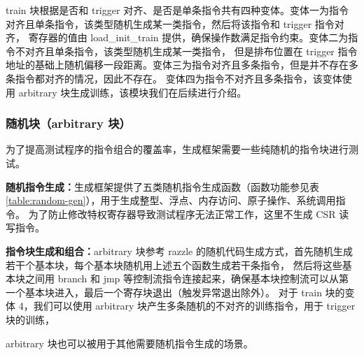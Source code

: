 train 块根据是否和 trigger 对齐、是否是单条指令共有四种变体。变体一为指令对齐且单条指令，该类型随机生成某一类指令，然后将该指令和 trigger 指令对齐，
寄存器的值由 load\_init\_train 提供，确保操作数满足指令约束。变体二为指令不对齐且单条指令，该类型随机生成某一类指令，
但是排布位置在 trigger 指令地址的基础上随机偏移一段距离。变体三为指令对齐且多条指令，但是并不存在多条指令都对齐的情况，因此不存在。
变体四为指令不对齐且多条指令，该变体使用 arbitrary 块生成训练，该模块我们在后续进行介绍。\par

\subsubsection{随机块（arbitrary 块）}
为了提高测试程序的指令组合的覆盖率，生成框架需要一些纯随机的指令块进行测试。\par

\textbf{随机指令生成：}生成框架提供了五类随机指令生成函数（函数功能参见表\ref{table:random-gen}），用于生成整型、浮点、内存访问、原子操作、系统调用指令。
为了防止修改特权寄存器导致测试程序无法正常工作，这里不生成 CSR 读写指令。\par

\textbf{指令块生成和组合：}arbitrary 块参考 razzle 的随机代码生成方式，首先随机生成若干个基本块，每个基本块随机用上述五个函数生成若干条指令，
然后将这些基本块之间用 branch 和 jmp 等控制流指令连接起来，确保基本块控制流可以从第一个基本块进入，最后一个寄存块退出（触发异常退出除外）。
对于 train 块的变体 4，我们可以使用 arbitrary 块产生多条随机的不对齐的训练指令，用于 trigger 块的训练，\par
arbitrary 块也可以被用于其他需要随机指令生成的场景。\par

\begin{table}[h!]
    \begin{center} 
    \caption{随机指令生成} 
    \label{table:random-gen}  
    \end{center}
\end{table}

